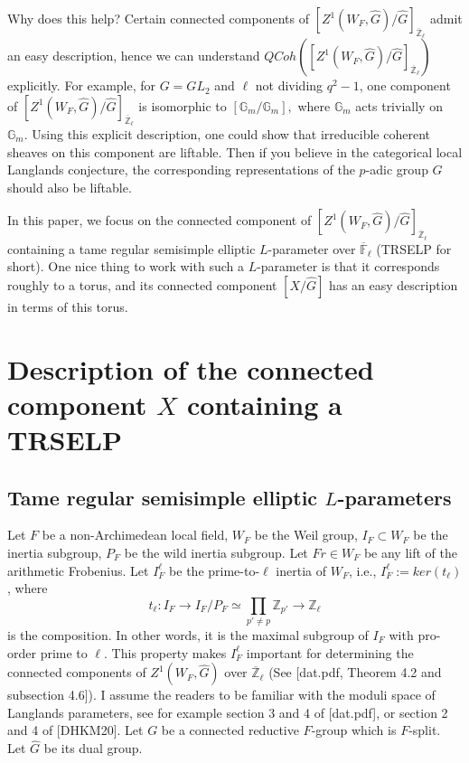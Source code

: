 \documentclass{article}
\newcommand{\red}[1]{\textcolor{red}{#1}}
\begin{document}
	Why does this help? Certain connected components of $[Z^1(W_F, \hat{G})/\hat{G}]_{\overline{\mathbb{Z}}_{\ell}}$ admit an easy description, hence we can understand $QCoh([Z^1(W_F, \hat{G})/\hat{G}]_{\overline{\mathbb{Z}}_{\ell}})$ explicitly. For example, for $G=GL_2$ and $\ell$ not dividing $q^2-1$, one component of $[Z^1(W_F, \hat{G})/\hat{G}]_{\overline{\mathbb{Z}}_{\ell}}$ is isomorphic to $[\mathbb{G}_m/\mathbb{G}_m],$ where $\mathbb{G}_m$ acts trivially on $\mathbb{G}_m$. Using this explicit description, one could show that irreducible coherent sheaves on this component are liftable. Then if you believe in the categorical local Langlands conjecture, the corresponding representations of the $p$-adic group $G$ should also be liftable. %
	
	In this paper, we focus on the connected component of $[Z^1(W_F, \hat{G})/\hat{G}]_{\overline{\mathbb{Z}}_{\ell}}$ containing a tame regular semisimple elliptic $L$-parameter over $\overline{\mathbb{F}}_{\ell}$ (TRSELP for short).  One nice thing to work with such a $L$-parameter is that it corresponds roughly to a torus, and its connected component $[X/\hat{G}]$ has an easy description in terms of this torus.
	
	
	
	\section{Description of the connected component $X$ containing a TRSELP}
	
	\subsection{Tame regular semisimple elliptic $L$-parameters}
	
	Let $F$ be a non-Archimedean local field, $W_F$ be the Weil group, $I_F \subset W_F$ be the inertia subgroup, $P_F$ be the wild inertia subgroup. Let $Fr \in W_F$ be any lift of the arithmetic Frobenius. Let $I_F^\ell$ be the prime-to-$\ell$ inertia of $W_F$, i.e., $I_F^\ell:=ker(t_\ell)$, where 
	$$t_\ell: I_F \to I_F/P_F \simeq \prod_{p' \neq p}\mathbb{Z}_{p'} \to \mathbb{Z}_\ell$$ 
	is the composition. In other words, it is the maximal subgroup of $I_F$ with pro-order prime to $\ell$. This property makes $I_F^\ell$ important for determining the connected components of $Z^1(W_F, \hat{G})$ over $\overline{\mathbb{Z}}_{\ell}$ (See [dat.pdf, Theorem 4.2 and subsection 4.6]). I assume the readers to be familiar with the moduli space of Langlands parameters, see for example section 3 and 4 of [dat.pdf], or section 2 and 4 of [DHKM20]. Let $G$ be a connected reductive $F$-group which is $F$-split. Let $\hat{G}$ be its dual group. 
	
\end{document}
